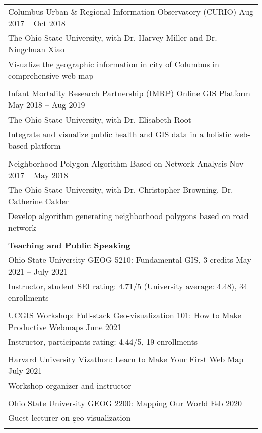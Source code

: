 \documentclass[letterpaper, 11pt]{article}
\begin{document}
\begin{longtable}{p{6.5in}}
Columbus Urban \& Regional Information Observatory (CURIO) \hfill Aug 2017 -- Oct 2018 \\
The Ohio State University, with Dr. Harvey Miller and Dr. Ningchuan Xiao \\
Visualize the geographic information in city of Columbus in comprehensive web-map \\\\

Infant Mortality Research Partnership (IMRP) Online GIS Platform \hfill May 2018 -- Aug 2019 \\
The Ohio State University, with Dr. Elisabeth Root \\
Integrate and visualize public health and GIS data in a holistic web-based platform \\\\

Neighborhood Polygon Algorithm Based on Network Analysis \hfill Nov 2017 -- May 2018 \\
The Ohio State University, with Dr. Christopher Browning, Dr. Catherine Calder \\
Develop algorithm generating neighborhood polygons based on road network \\\\


\textbf{Teaching and Public Speaking} \\
Ohio State University GEOG 5210: Fundamental GIS, 3 credits \hfill May 2021 -- July 2021 \\
Instructor, student SEI rating: 4.71/5 (University average: 4.48), 34 enrollments \\\\

UCGIS Workshop: Full-stack Geo-visualization 101: How to Make Productive Webmaps \hfill June 2021 \\
Instructor, participants rating: 4.44/5, 19 enrollments \\\\

Harvard University Vizathon: Learn to Make Your First Web Map \hfill July 2021\\
Workshop organizer and instructor \\\\

Ohio State University GEOG 2200: Mapping Our World \hfill Feb 2020\\
Guest lecturer on geo-visualization \\\\


\end{longtable}
\end{document}
